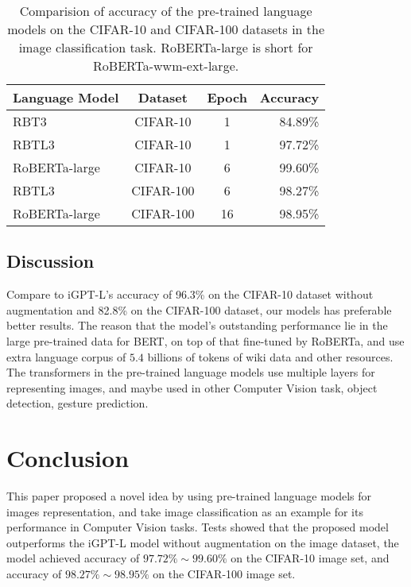 \documentclass[review]{cvpr}
\begin{document}
\begin{table}
\begin{center}
\begin{tabular}{|l|c|c|r|}
\hline
Language Model 	& Dataset & Epoch & Accuracy \\
\hline\hline
RBT3   & CIFAR-10 & 1	&	84.89\% \\
RBTL3  & CIFAR-10 & 1	&	97.72\% \\
RoBERTa-large  & CIFAR-10 & 6	&	99.60\% \\
RBTL3  & CIFAR-100 & 6  & 	98.27\% \\
RoBERTa-large & CIFAR-100 & 16 &	98.95\% \\
\hline
\end{tabular}
\end{center}
\caption{Comparision of accuracy of the pre-trained language models on the CIFAR-10 and CIFAR-100 datasets in the image classification task.
RoBERTa-large is short for RoBERTa-wwm-ext-large.}
\end{table}


\subsection{Discussion}

 Compare to iGPT-L's accuracy of 96.3\% on the CIFAR-10 dataset without augmentation and 82.8\% on the CIFAR-100 dataset, our models has preferable better results.
The reason that the model's outstanding performance lie in the large pre-trained data for BERT, on top of that fine-tuned by RoBERTa, and use extra language corpus of
$5.4$ billions of tokens of wiki data and other resources.
The transformers in the pre-trained language models use multiple layers for representing images, and maybe used in other Computer Vision task, \eg object detection, gesture prediction.


\section{Conclusion}

This paper proposed a novel idea by using pre-trained language models for images representation, and take image classification as an example for its performance in Computer Vision tasks.
Tests showed that the proposed model outperforms the iGPT-L model without augmentation on the image dataset,
the model achieved accuracy of $97.72\%\sim99.60\%$ on the CIFAR-10 image set,
and accuracy of $98.27\%\sim98.95\%$ on the CIFAR-100 image set.


{\small


}
\end{document}
